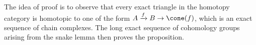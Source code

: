 
 
    The idea of proof is to observe that every exact triangle in the homotopy category is homotopic to one of the form $A\xrightarrow{f} B \to \cone(f)$, which is an exact sequence of chain complexes. The long exact sequence of cohomology groups arising from the snake lemma then proves the proposition.
 